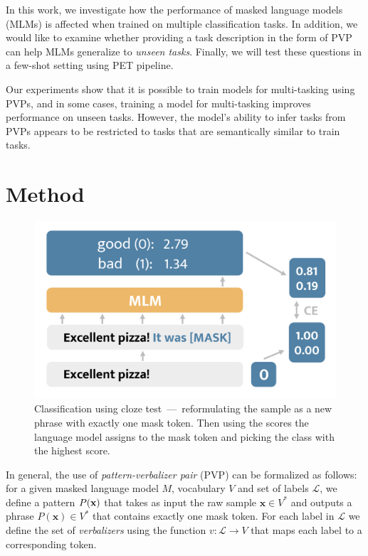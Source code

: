 \documentclass[11pt,a4paper]{article}
\begin{document}
In this work, we investigate how the performance of masked language models (MLMs) is affected when trained on multiple classification tasks.
In addition, we would like to examine whether providing a task description in the form of PVP can help MLMs generalize to \textit{unseen tasks}.
Finally, we will test these questions in a few-shot setting using PET pipeline.

Our experiments show that it is possible to train models for multi-tasking using PVPs,
and in some cases, training a model for multi-tasking improves performance on unseen tasks.
However, the model's ability to infer tasks from PVPs appears to be restricted to tasks that are semantically similar to train tasks.

\section{Method}
\label{sec:method}

\begin{figure}[h]
	\centering
	\includegraphics[width=\linewidth]{mlm_classification}
	\caption{Classification using cloze test~---~reformulating the sample as a new phrase with exactly one mask token. Then using the scores the language model assigns to the mask token and picking the class with the highest
 score.}
	\label{fig:method}
\vspace{-10pt}
\end{figure}

In general, the use of \textit{pattern-verbalizer pair} (PVP) can be formalized as follows: for a given masked language model $M$, vocabulary $V$ and set of labels $\mathcal{L}$, we define a pattern $P(\textbf{\text{x}})$ that takes as input the raw sample $\textbf{x}\in{}V^*$ and outputs a phrase $P(\textbf{x})\in{}V^*$ that contains exactly one mask token.
For each label in $\mathcal{L}$ we define the set of \textit{verbalizers} using the function $v:\mathcal{L}\rightarrow{}V$ that maps each label to a corresponding token.
\end{document}
